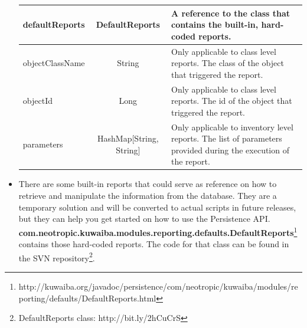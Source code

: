 \documentclass[a4paper]{article}
\begin{document}
\begin{itemize}
\begin{table}[h!]
\begin{tabular}{lcp{7cm}}
					\midrule
					defaultReports & DefaultReports & A reference to the class that contains the built-in, hard-coded reports. \\
					\midrule
					objectClassName & String & Only applicable to class level reports. The class of the object that triggered the report. \\
					\midrule
					objectId & Long & Only applicable to class level reports. The id of the object that triggered the report. \\
					\midrule
					parameters & HashMap[String, String] & Only applicable to inventory level reports. The list of parameters provided during the execution of the report.\\
				\end{tabular}
			\end{table}
			\item There are some built-in reports that could serve as reference on how to retrieve and manipulate the information from the database. They are a temporary solution and will be converted to actual scripts in future releases, but they can help you get started on how to use the Persistence API.\\
			\newline
			\textbf{com.neotropic.kuwaiba.modules.reporting.defaults.DefaultReports}\footnote{http://kuwaiba.org/javadoc/persistence/com/neotropic/kuwaiba/modules/reporting/defaults/DefaultReports.html} contains those hard-coded reports. The code for that class can be found in the SVN repository\footnote{DefaultReports class: http://bit.ly/2hCuCrS}.
		\end{itemize}
		
		\newpage
\end{document}
